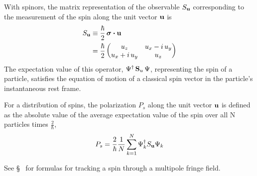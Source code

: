 With spinors, the matrix representation of the observable $S_{{\bf u}}$
corresponding to the measurement of the spin along the unit vector
${\bf u}$ is
\begin{align}
  S_{{\bf u}} &\equiv \frac{\hbar}{2} \, \boldsymbol{\sigma} \mathbin{\boldsymbol{\cdot}} {\bf u} \\   
            &= \frac{\hbar}{2} 
                   \begin{pmatrix} 
                     u_z            & u_x - i \, u_y \\
                     u_x + i \, u_y & u_z
                   \end{pmatrix}
\end{align}
The expectation value of this operator, $\Psi^\dagger \, {\bf S}_u \, \Psi$, representing the spin of
a particle, satisfies the equation of motion of a classical spin vector in the particle's
instantaneous rest frame.

For a distribution of spins, the polarization $P_s$ along the unit
vector ${\bf u}$ is defined as the absolute value of the average
expectation value of the spin over all N particles times
$\frac{2}{\hbar}$,
  \begin{equation}
    P_s = \frac{2}{\hbar} \frac{1}{N} \sum_{k=1}^{N} \Psi_k^\dagger S_{{\bf u}} \Psi_k
  \end{equation}  

See \S~ for formulas for tracking a spin through a multipole
fringe field.
